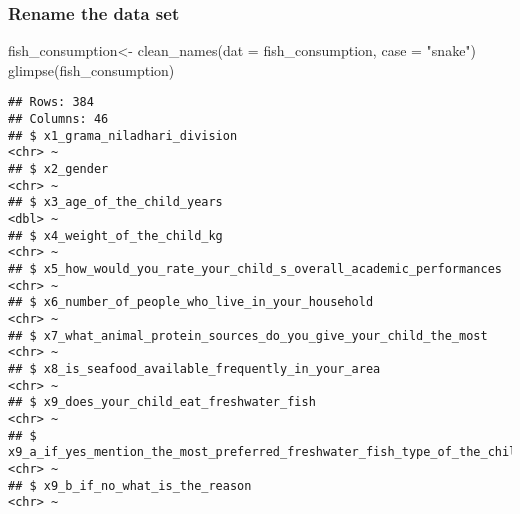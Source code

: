\documentclass[
]{article}
\newenvironment{Shaded}{\begin{snugshade}}{\end{snugshade}}
\newcommand{\AttributeTok}[1]{\textcolor[rgb]{0.77,0.63,0.00}{#1}}
\newcommand{\FunctionTok}[1]{\textcolor[rgb]{0.00,0.00,0.00}{#1}}
\newcommand{\NormalTok}[1]{#1}
\newcommand{\OtherTok}[1]{\textcolor[rgb]{0.56,0.35,0.01}{#1}}
\newcommand{\StringTok}[1]{\textcolor[rgb]{0.31,0.60,0.02}{#1}}
\begin{document}
\hypertarget{rename-the-data-set}{%
\subsubsection{Rename the data set}\label{rename-the-data-set}}

\begin{Shaded}
\begin{Highlighting}[]
\NormalTok{fish\_consumption}\OtherTok{\textless{}{-}} \FunctionTok{clean\_names}\NormalTok{(}\AttributeTok{dat =}\NormalTok{ fish\_consumption, }\AttributeTok{case =} \StringTok{"snake"}\NormalTok{) }
\FunctionTok{glimpse}\NormalTok{(fish\_consumption)}
\end{Highlighting}
\end{Shaded}

\begin{verbatim}
## Rows: 384
## Columns: 46
## $ x1_grama_niladhari_division                                                                                                                  <chr> ~
## $ x2_gender                                                                                                                                    <chr> ~
## $ x3_age_of_the_child_years                                                                                                                    <dbl> ~
## $ x4_weight_of_the_child_kg                                                                                                                    <chr> ~
## $ x5_how_would_you_rate_your_child_s_overall_academic_performances                                                                             <chr> ~
## $ x6_number_of_people_who_live_in_your_household                                                                                               <chr> ~
## $ x7_what_animal_protein_sources_do_you_give_your_child_the_most                                                                               <chr> ~
## $ x8_is_seafood_available_frequently_in_your_area                                                                                              <chr> ~
## $ x9_does_your_child_eat_freshwater_fish                                                                                                       <chr> ~
## $ x9_a_if_yes_mention_the_most_preferred_freshwater_fish_type_of_the_child                                                                     <chr> ~
## $ x9_b_if_no_what_is_the_reason                                                                                                                <chr> ~

\end{verbatim}
\end{document}
